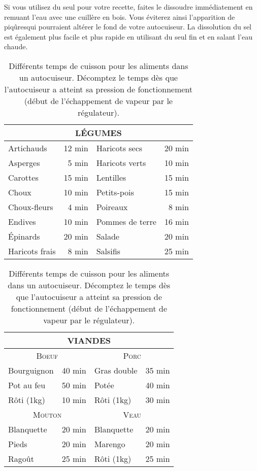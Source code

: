 \documentclass[a4paper,twoside,openright]{report}
\begin{document}
\begin{remarque}
Si vous utilisez du seul pour votre recette, faites le dissoudre immédiatement en remuant l'eau avec une cuillère en bois. Vous éviterez ainsi l'apparition de \og piqûres\fg qui pourraient altérer le fond de votre autocuiseur. La dissolution du sel est également plus facile et plus rapide en utilisant du seul fin et en salant l'eau chaude.
\end{remarque}

\begin{table}[htb]
\centering
\begin{tabular}{|l|r||l|r|}
\hline
\multicolumn{4}{|c|}{\textbf{LÉGUMES}}\\\hline
Artichauds & 12 min & Haricots secs & 20 min\\\hline
Asperges & 5 min & Haricots verts & 10 min\\\hline
Carottes & 15 min & Lentilles & 15 min\\\hline
Choux & 10 min & Petits-pois & 15 min\\\hline
Choux-fleurs & 4 min & Poireaux & 8 min\\\hline
Endives & 10 min & Pommes de terre & 16 min\\\hline
Épinards & 20 min & Salade & 20 min\\\hline
Haricots frais & 8 min & Salsifis & 25 min\\\hline
\end{tabular}

\bigskip

\begin{tabular}{|l|r||l|r|}
\hline
\multicolumn{4}{|c|}{\textbf{VIANDES}}\\\hline
\multicolumn{2}{|c||}{\textsc{Boeuf}} & \multicolumn{2}{c|}{\textsc{Porc}}\\\hline
Bourguignon & 40 min & Gras double & 35 min\\\hline
Pot au feu & 50 min & Potée & 40 min\\\hline
Rôti (1kg) & 10 min & Rôti (1kg) & 30 min\\\hline
\multicolumn{2}{|c||}{\textsc{Mouton}} & \multicolumn{2}{c|}{\textsc{Veau}}\\\hline
Blanquette & 20 min & Blanquette & 20 min\\\hline
Pieds & 20 min & Marengo & 20 min\\\hline
Ragoût & 25 min & Rôti (1kg) & 25 min\\\hline
\end{tabular}

\caption{Différents temps de cuisson pour les aliments dans un autocuiseur. Décomptez le temps dès que l'autocuiseur a atteint sa pression de fonctionnement (début de l'échappement de vapeur par le régulateur).}\label{tab:cuisson_autocuiseur}
\end{table}
\end{document}
